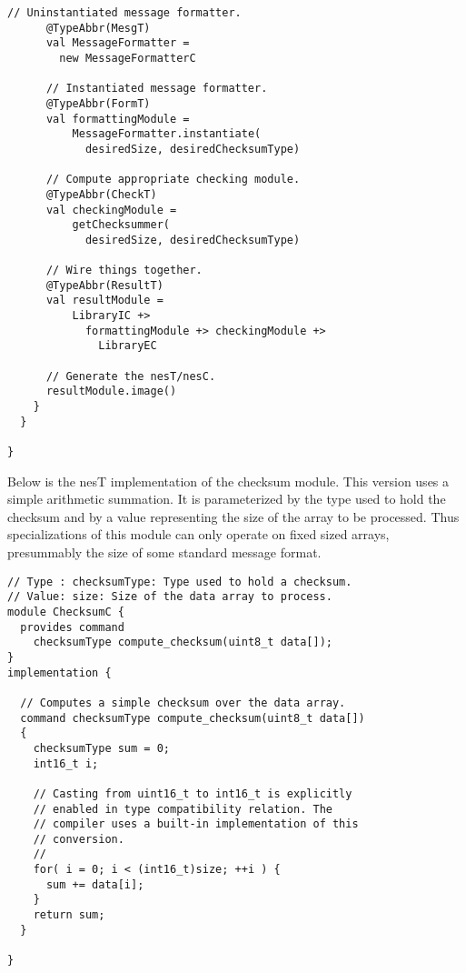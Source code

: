\begin{lstlisting}[language=scalaness]
      // Uninstantiated message formatter.
      @TypeAbbr(MesgT)
      val MessageFormatter =
        new MessageFormatterC

      // Instantiated message formatter.
      @TypeAbbr(FormT)
      val formattingModule =
          MessageFormatter.instantiate(
            desiredSize, desiredChecksumType)

      // Compute appropriate checking module.
      @TypeAbbr(CheckT)
      val checkingModule =
          getChecksummer(
            desiredSize, desiredChecksumType)
      
      // Wire things together.
      @TypeAbbr(ResultT)
      val resultModule =
          LibraryIC +>
            formattingModule +> checkingModule +>
              LibraryEC

      // Generate the nesT/nesC.
      resultModule.image()
    }
  }

}       
\end{lstlisting}
\vspace{1.0ex}
\primaryspacing

Below is the nesT implementation of the checksum module. This version uses a simple arithmetic
summation. It is parameterized by the type used to hold the checksum and by a value representing
the size of the array to be processed. Thus specializations of this module can only operate on
fixed sized arrays, presummably the size of some standard message format.

\singlespace
\vspace{1.0ex}
\begin{lstlisting}[language=nesC]
// Type : checksumType: Type used to hold a checksum.
// Value: size: Size of the data array to process.
module ChecksumC {
  provides command
    checksumType compute_checksum(uint8_t data[]);
}
implementation {
   
  // Computes a simple checksum over the data array.
  command checksumType compute_checksum(uint8_t data[])
  {
    checksumType sum = 0;
    int16_t i;
        
    // Casting from uint16_t to int16_t is explicitly
    // enabled in type compatibility relation. The
    // compiler uses a built-in implementation of this
    // conversion.
    //
    for( i = 0; i < (int16_t)size; ++i ) {
      sum += data[i];
    }
    return sum;
  }
    
}
\end{lstlisting}
\vspace{1.0ex}
\primaryspacing

